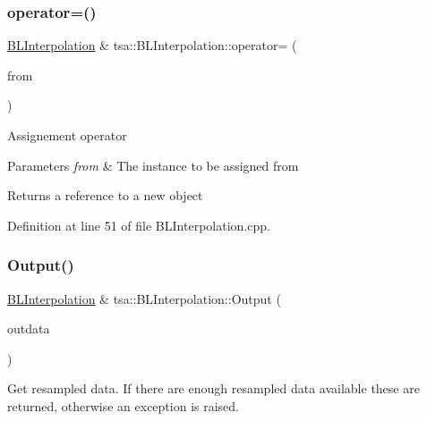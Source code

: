 \mbox{\label{classtsa_1_1_b_l_interpolation_a71b2bc1e0a68abe528d5c753b4a5c1c1}} 
\subsubsection{\texorpdfstring{operator=()}{operator=()}}
{\footnotesize\ttfamily \hyperlink{classtsa_1_1_b_l_interpolation}{B\+L\+Interpolation} \& tsa\+::\+B\+L\+Interpolation\+::operator= (\begin{DoxyParamCaption}\item[{const \hyperlink{classtsa_1_1_b_l_interpolation}{B\+L\+Interpolation} \&}]{from }\end{DoxyParamCaption})}

Assignement operator


\begin{DoxyParams}{Parameters}
{\em from} & The instance to be assigned from\\
\hline
\end{DoxyParams}
\begin{DoxyReturn}{Returns}
a reference to a new object 
\end{DoxyReturn}


Definition at line 51 of file B\+L\+Interpolation.\+cpp.

\mbox{\label{classtsa_1_1_b_l_interpolation_aa67c8de249d447dea6bb6b9d353139bc}} 
\subsubsection{\texorpdfstring{Output()}{Output()}}
{\footnotesize\ttfamily \hyperlink{classtsa_1_1_b_l_interpolation}{B\+L\+Interpolation} \& tsa\+::\+B\+L\+Interpolation\+::\+Output (\begin{DoxyParamCaption}\item[{\hyperlink{namespacetsa_ac599574bcc094eda25613724b8f3ca9e}{Seq\+View\+Double} \&}]{outdata }\end{DoxyParamCaption})}

Get resampled data. If there are enough resampled data available these are returned, otherwise an exception is raised.


